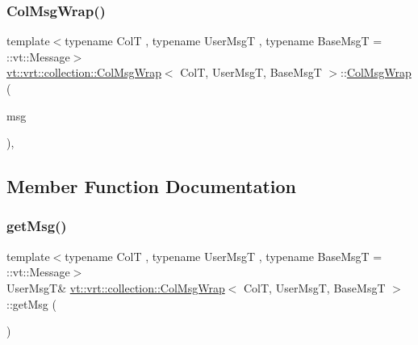 \subsubsection{\texorpdfstring{Col\+Msg\+Wrap()}{ColMsgWrap()}\hspace{0.1cm}{\footnotesize\ttfamily [3/3]}}
{\footnotesize\ttfamily template$<$typename ColT , typename User\+MsgT , typename Base\+MsgT  = \+::vt\+::\+Message$>$ \\
\hyperlink{structvt_1_1vrt_1_1collection_1_1_col_msg_wrap}{vt\+::vrt\+::collection\+::\+Col\+Msg\+Wrap}$<$ ColT, User\+MsgT, Base\+MsgT $>$\+::\hyperlink{structvt_1_1vrt_1_1collection_1_1_col_msg_wrap}{Col\+Msg\+Wrap} (\begin{DoxyParamCaption}\item[{User\+MsgT const \&}]{msg }\end{DoxyParamCaption})\hspace{0.3cm}{\ttfamily [inline]}, {\ttfamily [explicit]}}



\subsection{Member Function Documentation}
\mbox{\label{structvt_1_1vrt_1_1collection_1_1_col_msg_wrap_a69d30485a72651a7ede17f6bcdb13cd4}} 
\subsubsection{\texorpdfstring{get\+Msg()}{getMsg()}}
{\footnotesize\ttfamily template$<$typename ColT , typename User\+MsgT , typename Base\+MsgT  = \+::vt\+::\+Message$>$ \\
User\+MsgT\& \hyperlink{structvt_1_1vrt_1_1collection_1_1_col_msg_wrap}{vt\+::vrt\+::collection\+::\+Col\+Msg\+Wrap}$<$ ColT, User\+MsgT, Base\+MsgT $>$\+::get\+Msg (\begin{DoxyParamCaption}{ }\end{DoxyParamCaption})\hspace{0.3cm}{\ttfamily [inline]}}

\mbox{\label{structvt_1_1vrt_1_1collection_1_1_col_msg_wrap_ad225439a1358090be0ad57cb536eb1d3}} 
